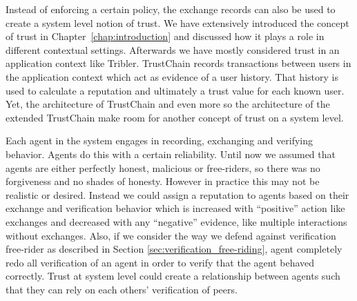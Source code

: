 Instead of enforcing a certain policy, the exchange records can also be used to create a system level 
notion of trust. We have extensively introduced the concept of trust in Chapter~\ref{chap:introduction} and discussed
how it plays a role in different contextual settings. Afterwards we have mostly considered trust in 
an application context like Tribler. TrustChain records transactions between users in the application
context which act as evidence of a user history. That history is used to calculate a reputation and
ultimately a trust value for each known user. Yet, the architecture of TrustChain and even more so 
the architecture of the extended TrustChain make room for another concept of trust on a system level.

Each agent in the system engages in recording, exchanging and verifying behavior. Agents do this 
with a certain reliability. Until now we assumed that agents are either perfectly honest, malicious
or free-riders, so there was no forgiveness and no shades of honesty. However in practice this may not be realistic or 
desired. Instead we could assign a reputation to agents based on their exchange and verification 
behavior which is increased with ``positive'' action like exchanges and decreased with any 
``negative'' evidence, like multiple interactions without exchanges. Also, if we consider the way 
we defend against verification free-rider as described in Section \ref{sec:verification_free-riding}, 
agent completely redo all verification of an agent in order to verify that the agent behaved correctly.
Trust at system level could create a relationship between agents such that they can rely on each 
others' verification of peers. 




